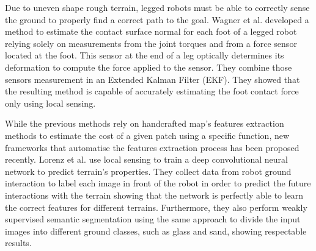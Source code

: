 \documentclass[../document.tex]{subfiles}
\begin{document}
Due to uneven shape rough terrain, legged robots must be able to correctly sense the ground to properly find a correct path to the goal. Wagner et al. \cite{wagner2016foot} developed a method to estimate the contact surface normal for each foot of a legged robot relying solely on measurements from the joint torques and from a force sensor located at the foot. This sensor at the end of a leg optically determines its deformation to compute the force applied to the sensor. They combine those sensors measurement in an Extended Kalman Filter (EKF). They showed that the resulting method is capable of accurately estimating the foot contact force only using local sensing.

While the previous methods rely on handcrafted map's features extraction methods to estimate the cost of a given patch using a specific function, new frameworks that automatise the features extraction process has been proposed recently. Lorenz et al. \cite{wellhausen2019where} use local sensing to train a deep convolutional neural network to predict terrain's properties. They collect data from robot ground interaction to label each image in front of the robot in order to predict the future interactions with the terrain showing that the network is perfectly able to learn the correct features for different terrains.
Furthermore, they also perform weakly supervised semantic segmentation using the same approach to divide the input images into different ground classes, such as glass and sand, showing respectable results.
\end{document}
